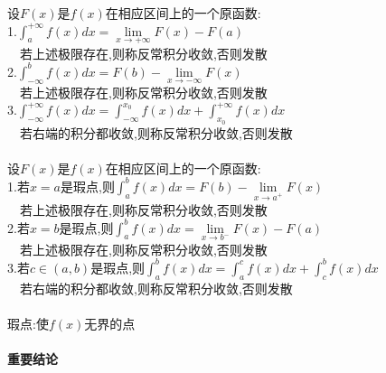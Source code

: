 \documentclass{article}
\begin{document}
\begin{flushleft}
	设$F(x)$是$f(x)$在相应区间上的一个原函数:\\
	1.$\int_{a}^{+\infty}f(x)dx=\lim\limits_{x\to+\infty}F(x)-F(a)$\\
	\ \ 若上述极限存在,则称反常积分收敛,否则发散\\
	2.$\int_{-\infty}^{b}f(x)dx=F(b)-\lim\limits_{x\to-\infty}F(x)$\\
	\ \ 若上述极限存在,则称反常积分收敛,否则发散\\
	3.$\int_{-\infty}^{+\infty}f(x)dx=\int_{-\infty}^{x_0}f(x)dx+\int_{x_0}^{+\infty}f(x)dx$\\
	\ \ 若右端的积分都收敛,则称反常积分收敛,否则发散\\
	~\\
	设$F(x)$是$f(x)$在相应区间上的一个原函数:\\
	1.若$x=a$是瑕点,则$\int_{a}^{b}f(x)dx=F(b)-\lim\limits_{x\to a^+}F(x)$\\
	\ \ 若上述极限存在,则称反常积分收敛,否则发散\\
	2.若$x=b$是瑕点,则$\int_{a}^{b}f(x)dx=\lim\limits_{x\to b^-}F(x)-F(a)$\\
	\ \ 若上述极限存在,则称反常积分收敛,否则发散\\
	3.若$c\in(a,b)$是瑕点,则$\int_{a}^{b}f(x)dx=\int_{a}^{c}f(x)dx+\int_{c}^{b}f(x)dx$\\
	\ \ 若右端的积分都收敛,则称反常积分收敛,否则发散\\
	~\\
	瑕点:使$f(x)$无界的点\\
	
	~\\ \textbf{重要结论} \\~\\
	

\end{flushleft}
\end{document}
